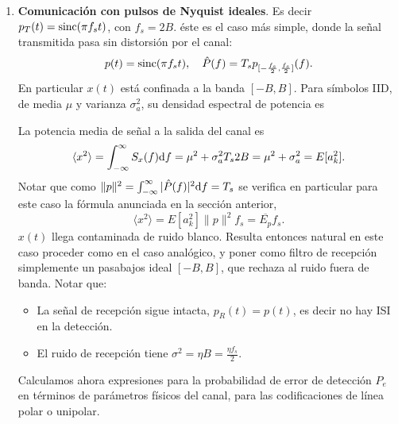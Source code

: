\begin{enumerate}
    \renewcommand\theenumi{\Roman{enumi}}
    \item \textbf{Comunicación con pulsos de Nyquist ideales}.
    \label{item:1}
    Es decir $p_T(t) = \operatorname{sinc}(\pi f_s t)$, con $f_s=2B$. éste es el caso más simple, donde la señal transmitida pasa sin distorsión por el
    canal:
 \[ p(t) = \operatorname{sinc}(\pi f_s t), \quad \hat{P}(f) = T_s
    p_{[-\frac{f_s}{2},\frac{f_s}{2}]}(f).\]
    En particular $x(t)$ está confinada a la banda $[-B,B]$. Para símbolos IID, de media $\mu$ y varianza
    $\sigma_a^2$, su densidad espectral de potencia es
    \begin{center}\begin{minipage}{\textwidth}
        \endpgfgraphicnamed\end{minipage}
    \end{center}
    La potencia media de señal a la salida del canal es
     \[
     \langle x ^2 \rangle = \int_{-\infty}^\infty S_x(f)\mathrm{d} f =
     \mu^2 + \sigma_a^2 T_s 2B = \mu^2 + \sigma_a^2 = E[a_k^2].
     \]
     Notar que como $\|p\|^2 = \int_{-\infty}^\infty |\hat{P}(f)|^2 \mathrm{d} f = T_s$ se verifica en particular para este caso la fórmula
     anunciada en la sección anterior,
     \[\langle x^2 \rangle = E[a_k^2] \|p\|^2 f_s = \overline{E_p}
     f_s.\]
    $x(t)$ llega contaminada de ruido blanco. Resulta entonces
    natural en este caso proceder  como en el caso analógico, y poner como
    filtro de recepción simplemente un pasabajos ideal $[-B,B]$,
    que rechaza al ruido fuera de banda. Notar que:
    \begin{itemize}
    \item La señal de recepción sigue intacta, $p_R(t) = p(t)$, es decir no hay ISI en la detección.
    \item El ruido de recepción tiene $\sigma^2=\eta B = \frac{\eta f_s}{2}$.
    \end{itemize}
%

    Calculamos ahora expresiones para la probabilidad de error de detección $P_e$ en términos de parámetros físicos del
    canal, para las codificaciones de línea polar o unipolar.


\end{enumerate}
